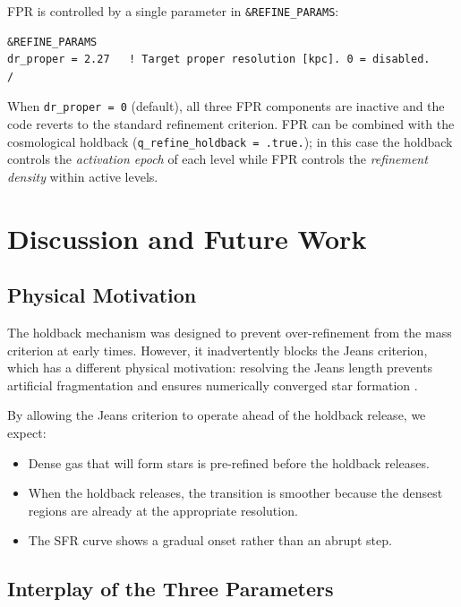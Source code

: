 \documentclass[fleqn,usenatbib]{mnras}
\newcommand{\code}[1]{\texttt{#1}}
\begin{document}
FPR is controlled by a single parameter in
\code{\&REFINE\_PARAMS}:
\begin{lstlisting}
&REFINE_PARAMS
dr_proper = 2.27   ! Target proper resolution [kpc]. 0 = disabled.
/
\end{lstlisting}
When \code{dr\_proper = 0} (default), all three FPR components are
inactive and the code reverts to the standard refinement criterion.
FPR can be combined with the cosmological holdback
(\code{q\_refine\_holdback = .true.}); in this case the holdback
controls the \emph{activation epoch} of each level while FPR controls
the \emph{refinement density} within active levels.


\section{Discussion and Future Work}
\label{sec:discussion}

\subsection{Physical Motivation}

The holdback mechanism was designed to prevent over-refinement from the
mass criterion at early times.  However, it inadvertently blocks the
Jeans criterion, which has a different physical motivation: resolving
the Jeans length prevents artificial fragmentation and ensures
numerically converged star formation \citep{Truelove1997, Federrath2011}.

By allowing the Jeans criterion to operate ahead of the holdback
release, we expect:
\begin{itemize}
  \item Dense gas that will form stars is pre-refined before the
    holdback releases.
  \item When the holdback releases, the transition is smoother because
    the densest regions are already at the appropriate resolution.
  \item The SFR curve shows a gradual onset rather than an abrupt step.
\end{itemize}

\subsection{Interplay of the Three Parameters}
\end{document}
